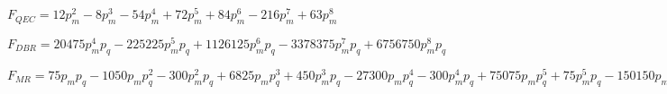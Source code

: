 $F_{QEC} = 12p_{m}^{2} - 8p_{m}^{3} - 54p_{m}^{4} + 72p_{m}^{5} + 84p_{m}^{6} - 216p_{m}^{7} + 63p_{m}^{8}$

$F_{DBR} = 20475p_{m}^{4}p_{q} - 225225p_{m}^{5}p_{q} + 1126125p_{m}^{6}p_{q} - 3378375p_{m}^{7}p_{q} + 6756750p_{m}^{8}p_{q}$

$F_{MR} = 75p_{m}p_{q} - 1050p_{m}p_{q}^{2} - 300p_{m}^{2}p_{q} + 6825p_{m}p_{q}^{3} + 450p_{m}^{3}p_{q} - 27300p_{m}p_{q}^{4} - 300p_{m}^{4}p_{q} + 75075p_{m}p_{q}^{5} + 75p_{m}^{5}p_{q} - 150150p_{m}p_{q}^{6} + 225225p_{m}p_{q}^{7} - 257400p_{m}p_{q}^{8}$

